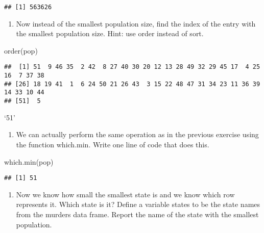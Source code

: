 \documentclass[
]{article}
\newenvironment{Shaded}{\begin{snugshade}}{\end{snugshade}}
\newcommand{\FunctionTok}[1]{\textcolor[rgb]{0.00,0.00,0.00}{#1}}
\newcommand{\NormalTok}[1]{#1}
\providecommand{\tightlist}{%
  \setlength{\itemsep}{0pt}\setlength{\parskip}{0pt}}
\begin{document}
\begin{verbatim}
## [1] 563626
\end{verbatim}

\begin{enumerate}
\def\labelenumi{\arabic{enumi}.}
\setcounter{enumi}{1}
\tightlist
\item
  Now instead of the smallest population size, find the index of the
  entry with the smallest population size. Hint: use order instead of
  sort.
\end{enumerate}

\begin{Shaded}
\begin{Highlighting}[]
\FunctionTok{order}\NormalTok{(pop)}
\end{Highlighting}
\end{Shaded}

\begin{verbatim}
##  [1] 51  9 46 35  2 42  8 27 40 30 20 12 13 28 49 32 29 45 17  4 25 16  7 37 38
## [26] 18 19 41  1  6 24 50 21 26 43  3 15 22 48 47 31 34 23 11 36 39 14 33 10 44
## [51]  5
\end{verbatim}

`51'

\begin{enumerate}
\def\labelenumi{\arabic{enumi}.}
\setcounter{enumi}{2}
\tightlist
\item
  We can actually perform the same operation as in the previous exercise
  using the function which.min. Write one line of code that does this.
\end{enumerate}

\begin{Shaded}
\begin{Highlighting}[]
\FunctionTok{which.min}\NormalTok{(pop)}
\end{Highlighting}
\end{Shaded}

\begin{verbatim}
## [1] 51
\end{verbatim}

\begin{enumerate}
\def\labelenumi{\arabic{enumi}.}
\setcounter{enumi}{3}
\tightlist
\item
  Now we know how small the smallest state is and we know which row
  represents it. Which state is it? Define a variable states to be the
  state names from the murders data frame. Report the name of the state
  with the smallest population.
\end{enumerate}
\end{document}
